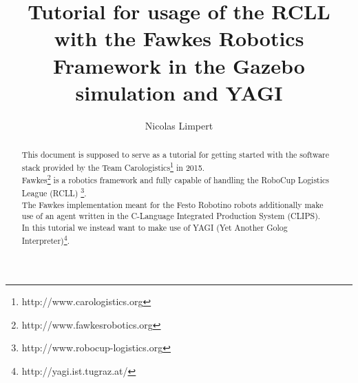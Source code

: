 \documentclass[oribibl]{llncs}
\begin{document}
 \title{Tutorial for usage of the RCLL with the Fawkes Robotics Framework in the Gazebo simulation and YAGI}

\author{Nicolas Limpert} 

\maketitle

\begin{abstract}
        This document is supposed to serve as a tutorial for getting started with the software stack provided by the Team Carologistics\footnote{http://www.carologistics.org} in 2015.\\
        Fawkes\footnote{http://www.fawkesrobotics.org} is a robotics framework and fully capable of handling the RoboCup Logistics League (RCLL) \footnote{http://www.robocup-logistics.org}.\\
        The Fawkes implementation meant for the Festo Robotino robots additionally make use of an agent written in the C-Language Integrated Production System (CLIPS).\\
        In this tutorial we instead want to make use of YAGI (Yet Another Golog Interpreter)\footnote{http://yagi.ist.tugraz.at/}.
\end{abstract}
\end{document}
